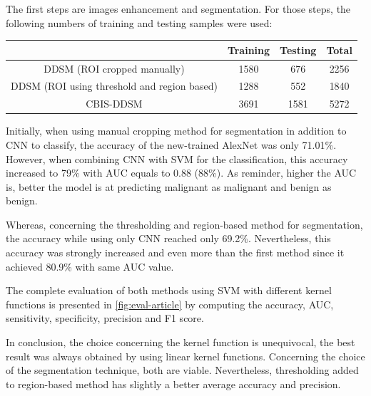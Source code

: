 \documentclass[11pt, openany]{report}
\theoremstyle{plain}
\theoremstyle{definition}
\theoremstyle{remark}
\begin{document}
The first steps are images enhancement and segmentation. For those steps, the following numbers of training and testing samples were used:
\begin{center}
    \begin{tabular}{|c|c|c|c|}
      \hline
       & Training & Testing & Total \\
      \hline
       DDSM (ROI cropped manually) & 1580 & 676 & 2256 \\
      \hline
       DDSM (ROI using threshold and region based) & 1288 & 552 & 1840 \\
      \hline
       CBIS-DDSM & 3691 & 1581 & 5272 \\
      \hline
    \end{tabular}
\end{center}

Initially, when using manual cropping method for segmentation in addition to CNN to classify, the accuracy of the new-trained AlexNet was only 71.01\%. However, when combining CNN with SVM for the classification, this accuracy increased to 79\% with AUC equals to 0.88 (88\%). As reminder, higher the AUC is, better the model is at predicting malignant as malignant and benign as benign.

Whereas, concerning the thresholding and region-based method for segmentation, the accuracy while using only CNN reached only 69.2\%. Nevertheless, this accuracy was strongly increased and even more than the first method since it achieved 80.9\% with same AUC value. 

The complete evaluation of both methods using SVM with different kernel functions is presented in \autoref{fig:eval-article} by computing the accuracy, AUC, sensitivity, specificity, precision and F1 score. 


In conclusion, the choice concerning the kernel function is unequivocal, the best result was always obtained by using linear kernel functions. Concerning the choice of the segmentation technique, both are viable. Nevertheless, thresholding added to region-based method has slightly a better average accuracy and precision.
\end{document}
